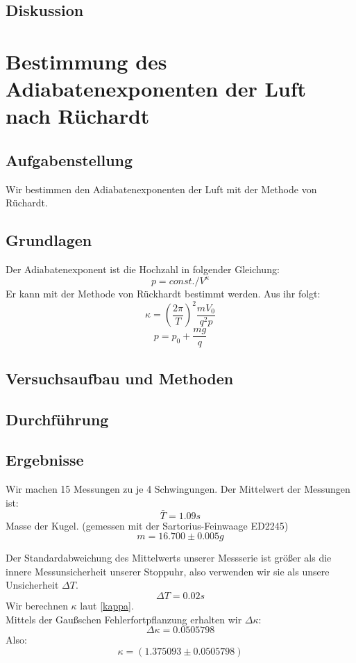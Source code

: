 \documentclass{article}
\begin{document}
\subsection{Diskussion}

\newpage
\section{Bestimmung des Adiabatenexponenten der Luft nach Rüchardt}
\subsection{Aufgabenstellung}
Wir bestimmen den Adiabatenexponenten der Luft mit der Methode von Rüchardt.
\subsection{Grundlagen}
Der Adiabatenexponent ist die Hochzahl in folgender Gleichung:\\
$$p=const./V^{\kappa}$$
Er kann mit der Methode von Rückhardt bestimmt werden. Aus ihr folgt:
\begin{equation}
\label{kappa}
\kappa=(\frac{2\pi}{T})^2 \frac{mV_0}{q^2p}
\end{equation}
$$p=p_0+\frac{mg}{q}$$
\subsection{Versuchsaufbau und Methoden}
\subsection{Durchführung}
\subsection{Ergebnisse}
Wir machen 15 Messungen zu je 4 Schwingungen. Der Mittelwert der Messungen ist:\\
$$\bar{T}=1.09s$$
Masse der Kugel. (gemessen mit der Sartorius-Feinwaage ED2245)\\
$$m=16.700\pm0.005g$$

Der Standardabweichung des Mittelwerts unserer Messserie ist größer als die innere Messunsicherheit unserer Stoppuhr, also verwenden wir sie als unsere Unsicherheit $\Delta T$.
$$\Delta T=0.02s$$
Wir  berechnen $\kappa$ laut \ref{kappa}. \\
Mittels der Gaußschen Fehlerfortpflanzung erhalten wir $\Delta\kappa$:
$$\Delta\kappa=0.0505798$$
Also:
$$\boxed{\kappa=(1.375093 \pm 0.0505798)} $$
\end{document}

